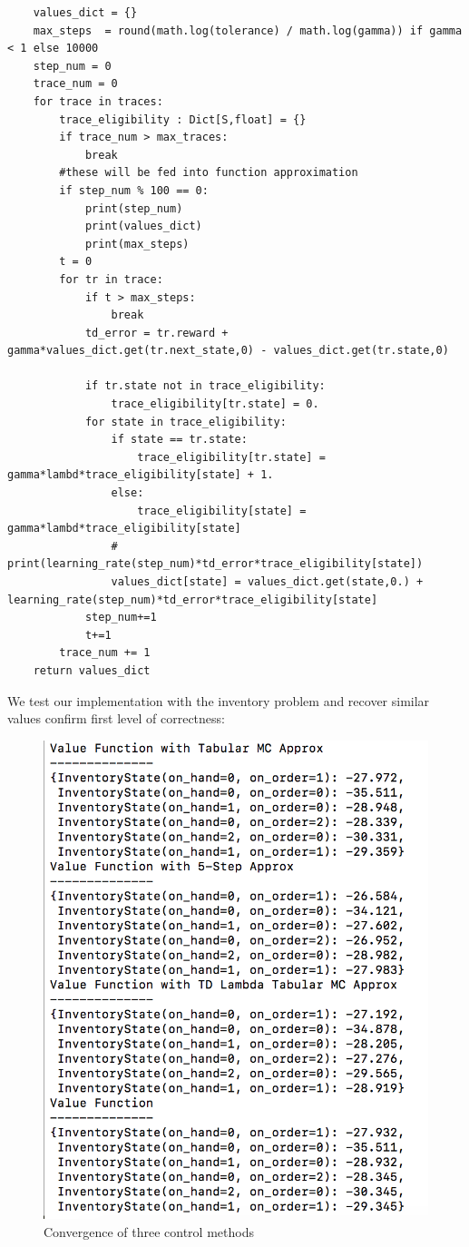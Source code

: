 \documentclass{article}[12pt]
\begin{document}
\begin{lstlisting}
    values_dict = {}
    max_steps  = round(math.log(tolerance) / math.log(gamma)) if gamma < 1 else 10000
    step_num = 0
    trace_num = 0
    for trace in traces:
        trace_eligibility : Dict[S,float] = {}
        if trace_num > max_traces:
        	break
        #these will be fed into function approximation
        if step_num % 100 == 0:
            print(step_num)
            print(values_dict)
            print(max_steps)
        t = 0
        for tr in trace:
            if t > max_steps:
                break
            td_error = tr.reward + gamma*values_dict.get(tr.next_state,0) - values_dict.get(tr.state,0)
            
            if tr.state not in trace_eligibility:
                trace_eligibility[tr.state] = 0.
            for state in trace_eligibility:
                if state == tr.state:
                    trace_eligibility[tr.state] = gamma*lambd*trace_eligibility[state] + 1.
                else:
                    trace_eligibility[state] = gamma*lambd*trace_eligibility[state]
                # print(learning_rate(step_num)*td_error*trace_eligibility[state])
                values_dict[state] = values_dict.get(state,0.) + learning_rate(step_num)*td_error*trace_eligibility[state]
            step_num+=1
            t+=1
        trace_num += 1
    return values_dict
\end{lstlisting}

We test our implementation with the inventory problem and recover similar values confirm first level of correctness:

\begin{figure}[h]
  \includegraphics[width=0.5\linewidth]{correctness.png}
  \caption{Convergence of three control methods}
  \label{fig:optPol1}
\end{figure}
\end{document}
